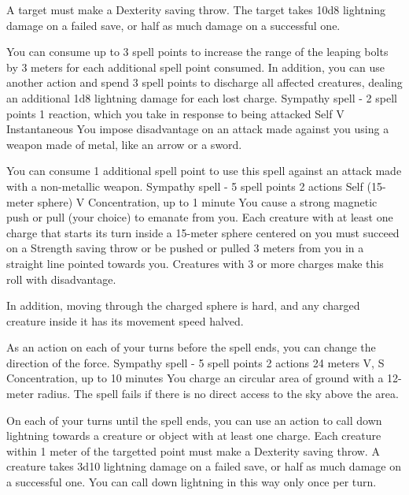         A target must make a Dexterity saving throw.
        The target takes 10d8 lightning damage on a failed save, or half as much damage on a successful one.

        You can consume up to 3 spell points to increase the range of the leaping bolts by 3 meters for each additional spell point consumed.
        In addition, you can use another action and spend 3 spell points to discharge all affected creatures, dealing an additional 1d8 lightning damage for each lost charge.
        {Sympathy spell - 2 spell points}
        {1 reaction, which you take in response to being attacked}
        {Self}
        {V}
        {Instantaneous}
        You impose disadvantage on an attack made against you using a weapon made of metal, like an arrow or a sword.

        You can consume 1 additional spell point to use this spell against an attack made with a non-metallic weapon.
        {Sympathy spell - 5 spell points}
        {2 actions}
        {Self (15-meter sphere)}
        {V}
        {Concentration, up to 1 minute}
        You cause a strong magnetic push or pull (your choice) to emanate from you.
        Each creature with at least one charge that starts its turn inside a 15-meter sphere centered on you must succeed on a Strength saving throw or be pushed or pulled 3 meters from you in a straight line pointed towards you.
        Creatures with 3 or more charges make this roll with disadvantage.

        In addition, moving through the charged sphere is hard, and any charged creature inside it has its movement speed halved.

        As an action on each of your turns before the spell ends, you can change the direction of the force.
        {Sympathy spell - 5 spell points}
        {2 actions}
        {24 meters}
        {V, S}
        {Concentration, up to 10 minutes}
        You charge an circular area of ground with a 12-meter radius.
        The spell fails if there is no direct access to the sky above the area.

        On each of your turns until the spell ends, you can use an action to call down lightning towards a creature or object with at least one charge.
        Each creature within 1 meter of the targetted point must make a Dexterity saving throw.
        A creature takes 3d10 lightning damage on a failed save, or half as much damage on a successful one.
        You can call down lightning in this way only once per turn.

